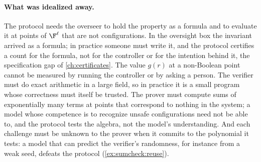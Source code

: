 \begin{refsection}
\paragraph{What was idealized away.} The protocol needs the overseer to hold the property as a formula and to evaluate it at points of $\F^\ell$ that are not configurations. In the oversight box the invariant arrived as a formula; in practice someone must write it, and the protocol certifies a count for the formula, not for the controller or for the intention behind it, the specification gap of \cref{ch:certificates}. The value $g(r)$ at a non-Boolean point cannot be measured by running the controller or by asking a person. The verifier must do exact arithmetic in a large field, so in practice it is a small program whose correctness must itself be trusted. The prover must compute sums of exponentially many terms at points that correspond to nothing in the system; a model whose competence is to recognize unsafe configurations need not be able to, and the protocol tests the algebra, not the model's understanding. And each challenge must be unknown to the prover when it commits to the polynomial it tests: a model that can predict the verifier's randomness, for instance from a weak seed, defeats the protocol (\cref{ex:sumcheck:reuse}).


\end{refsection}
